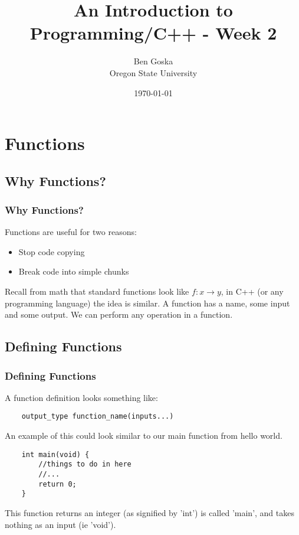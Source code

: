 \documentclass{beamer}
\title{An Introduction to Programming/C++ - Week 2}
\author{Ben Goska \\ Oregon State University}
\date{\today}
\begin{document}
\lstset{language=c++,
        numbers=left,
        showspaces=false,
	showstringspaces=false,
	basicstyle=\footnotesize
	}

\begin{frame}
	\titlepage
\end{frame}

\section[Outline]{}
\frame{\tableofcontents}

\section{Functions}

\subsection{Why Functions?}

\begin{frame}
	\frametitle{Why Functions?}
	Functions are useful for two reasons:
	\begin{itemize}
		\item Stop code copying
		\item Break code into simple chunks
	\end{itemize}
	Recall from math that standard functions look like
	$f:x \rightarrow y$, in C++ (or any programming language)
	the idea is similar. A function has a name, some input
	and some output. We can perform any operation in a function.
\end{frame}

\subsection{Defining Functions}

\begin{frame}[fragile]
	\frametitle{Defining Functions}
	A function definition looks something like:
	\begin{lstlisting}
	output_type function_name(inputs...)
	\end{lstlisting}
	An example of this could look similar to our main function from
	hello world.
	\begin{lstlisting}
	int main(void) {
	    //things to do in here
	    //...
	    return 0;
	}
	\end{lstlisting}
	This function returns an integer (as signified by 'int') is 
	called 'main', and takes nothing as an input (ie 'void').
\end{frame}
\end{document}
